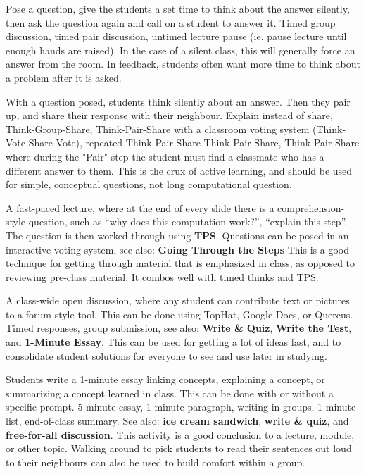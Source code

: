 {


{Pose a question, give the students a set time 
to think about the answer silently, then ask the question again and 
call on a student to answer it.}
{Timed group discussion, timed pair
discussion, untimed lecture pause (ie, pause lecture until enough
hands are raised).}
{In the case of a silent class, this will generally
force an answer from the room. In feedback, students often want
more time to think about a problem after it is asked.}

{With a question posed, students 
think silently about an answer. Then they pair up, and share their 
response with their neighbour.}
{Explain instead of share, 
Think-Group-Share, Think-Pair-Share 
with a classroom voting system (Think-Vote-Share-Vote), 
repeated Think-Pair-Share-Think-Pair-Share, Think-Pair-Share where during the "Pair" step the student must find a classmate who has a different answer to them.}
{This is the crux of active learning, 
and should be used for simple, conceptual questions, not 
long computational question.}

{A fast-paced lecture, where at the end of 
every slide there is a comprehension-style question, such as 
\enquote{why does this computation work?}, \enquote{explain 
this step}. The question is then worked through using 
\textbf{TPS}.}
{Questions can be posed in an interactive voting system, see also:
\textbf{Going Through the Steps}}
{This is a good technique for getting 
through material that is emphasized in class, as opposed 
to reviewing pre-class material. It combos well with 
timed thinks and TPS.}

{A class-wide open discussion, where 
any student can contribute text or pictures to a forum-style 
tool. This can be done using TopHat, Google Docs, or Quercus.}
{Timed responses, group submission, 
see also: \textbf{Write \& Quiz}, \textbf{Write the Test}, 
and \textbf{1-Minute Essay}.}
{This can be used for getting a lot of ideas 
fast, and to consolidate student solutions for everyone 
to see and use later in studying.}

{Students write a 1-minute essay 
linking concepts, explaining a concept, or summarizing 
a concept learned in class. This can be done with 
or without a specific prompt.}
{5-minute essay, 1-minute paragraph, 
writing in groups, 1-minute list, end-of-class summary. See 
also: \textbf{ice cream sandwich}, \textbf{write \& quiz}, 
and \textbf{free-for-all discussion}.}
{This activity is a good conclusion to a 
lecture, module, or other topic. Walking around to pick 
students to read their sentences out loud to their 
neighbours can also be used to build comfort 
within a group.}

}
